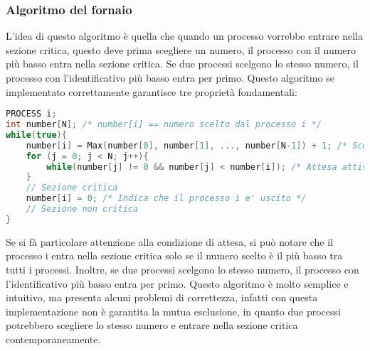            \subsubsection{Algoritmo del fornaio}
                L'idea di questo algoritmo è quella che quando un processo vorrebbe entrare nella sezione critica, questo deve prima scegliere un numero, il processo con il numero più basso entra nella sezione critica. Se due processi scelgono lo stesso numero, il processo con l'identificativo più basso entra per primo. Questo algoritmo se implementato correttamente garantisce tre proprietà fondamentali:
                \begin{lstlisting}[language=C++,basicstyle=\footnotesize]
PROCESS i;
int number[N]; /* number[i] == numero scelto dal processo i */
while(true){
    number[i] = Max(number[0], number[1], ..., number[N-1]) + 1; /* Sceglie un numero */
    for (j = 0; j < N; j++){
        while(number[j] != 0 && number[j] < number[i]); /* Attesa attiva */
    }
    // Sezione critica
    number[i] = 0; /* Indica che il processo i e' uscito */
    // Sezione non critica
}
                \end{lstlisting}
                Se si fà particolare attenzione alla condizione di attesa, si può notare che il processo i entra nella sezione critica solo se il numero scelto è il più basso tra tutti i processi. Inoltre, se due processi scelgono lo stesso numero, il processo con l'identificativo più basso entra per primo. Questo algoritmo è molto semplice e intuitivo, ma presenta alcuni problemi di correttezza, infatti con questa implementazione non è garantita la mutua esclusione, in quanto due processi potrebbero scegliere lo stesso numero e entrare nella sezione critica contemporaneamente.
